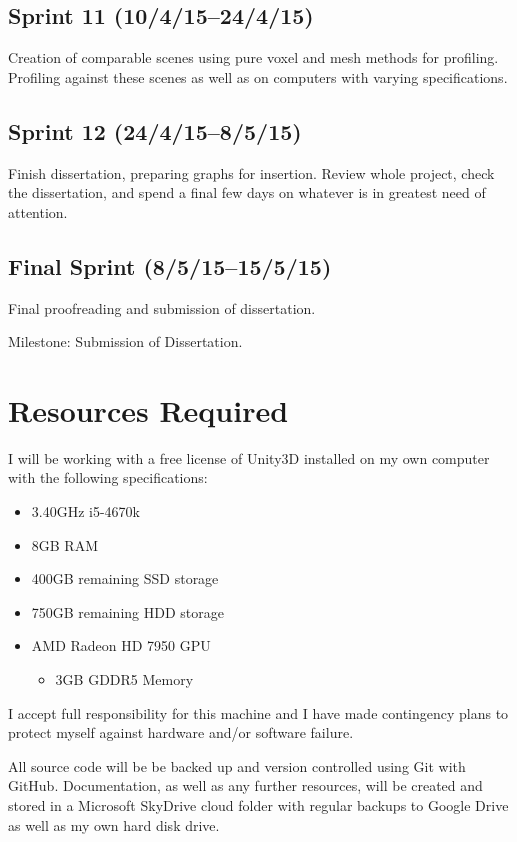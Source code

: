 \subsection*{Sprint 11 (10/4/15--24/4/15)}

Creation of comparable scenes using pure voxel and mesh methods for profiling.\\
Profiling against these scenes as well as on computers with varying specifications.


\subsection*{Sprint 12 (24/4/15--8/5/15)}

Finish dissertation, preparing graphs for insertion.  Review whole
project, check the dissertation, and spend a final few days on
whatever is in greatest need of attention.


\subsection*{Final Sprint (8/5/15--15/5/15)}

Final proofreading and submission of dissertation.

Milestone: Submission of Dissertation. 


\section*{Resources Required}

I will be working with a free license of Unity3D installed on my own computer with the following specifications:
\begin{itemize}
\item 3.40GHz i5-4670k
\item 8GB RAM
\item 400GB remaining SSD storage
\item 750GB remaining HDD storage
\item AMD Radeon HD 7950 GPU
	\begin{itemize}
	\item 3GB GDDR5 Memory
	\end{itemize}
\end{itemize}

I accept full responsibility for this machine and I have made contingency plans to protect myself against hardware and/or software failure.

All source code will be be backed up and version controlled using Git with GitHub. Documentation, as well as any further resources, will be created and stored in a Microsoft SkyDrive cloud folder with regular backups to Google Drive as well as my own hard disk drive.
